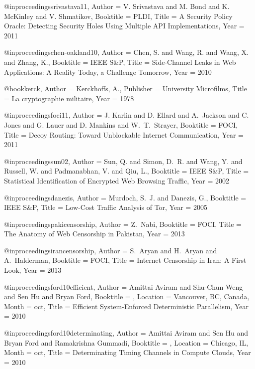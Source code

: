 {{{{{{{{{@inproceedings{srivastava11,
	Author = {V. Srivastava and M. Bond and K. McKinley and V. Shmatikov},
	Booktitle = {PLDI},
	Title = {{A Security Policy Oracle: Detecting Security Holes Using Multiple API Implementations}},
	Year = {2011}}

@inproceedings{chen-oakland10,
	Author = {Chen, S. and Wang, R. and Wang, X. and Zhang, K.},
	Booktitle = {IEEE S\&P},
	Title = {{Side-Channel Leaks in Web Applications: A Reality Today, a Challenge Tomorrow}},
	Year = {2010}}

@book{kerck,
	Author = {Kerckhoffs, A.},
	Publisher = {University Microfilms},
	Title = {{La cryptographie militaire}},
	Year = {1978}}

@inproceedings{foci11,
	Author = {J. Karlin and D. Ellard and A.~Jackson and C.~ Jones and G. Lauer and D. Mankins and W.~T.~Strayer},
	Booktitle = {FOCI},
	Title = {{Decoy Routing: Toward Unblockable Internet Communication}},
	Year = 2011}

@inproceedings{sun02,
	Author = {Sun, Q. and Simon, D.~R. and Wang, Y. and Russell, W. and Padmanabhan, V. and Qiu, L.},
	Booktitle = {IEEE S\&P},
	Title = {{Statistical Identification of Encrypted Web Browsing Traffic}},
	Year = {2002}}

@inproceedings{danezis,
	Author = {Murdoch, S.~J. and Danezis, G.},
	Booktitle = {IEEE S\&P},
	Title = {{Low-Cost Traffic Analysis of Tor}},
	Year = {2005}}

@inproceedings{pakicensorship,
	Author = {Z.~Nabi},
	Booktitle = {FOCI},
	Title = {The Anatomy of {Web} Censorship in {Pakistan}},
	Year = {2013}}

@inproceedings{irancensorship,
	Author = {S.~Aryan and H.~Aryan and A.~Halderman},
	Booktitle = {FOCI},
	Title = {Internet Censorship in {Iran}: {A} First Look},
	Year = {2013}}

@inproceedings{ford10efficient,
	Author = {Amittai Aviram and Shu-Chun Weng and Sen Hu and Bryan Ford},
	Booktitle = {},
	Location = {Vancouver, BC, Canada},
	Month = oct,
	Title = {Efficient System-Enforced Deterministic Parallelism},
	Year = 2010}

@inproceedings{ford10determinating,
	Author = {Amittai Aviram and Sen Hu and Bryan Ford and Ramakrishna Gummadi},
	Booktitle = {},
	Location = {Chicago, IL},
	Month = oct,
	Title = {Determinating Timing Channels in Compute Clouds},
	Year = 2010}

}}}}}}}}}
